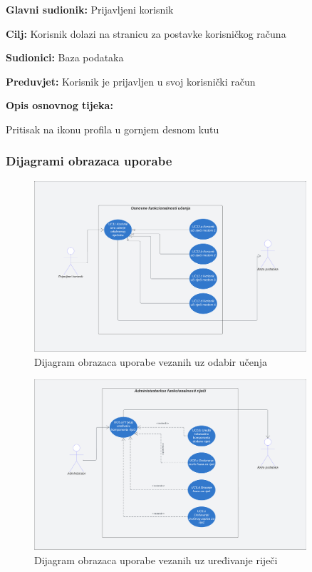 					\noindent {}
					\begin{packed_item}
						\item \textbf{Glavni sudionik:} Prijavljeni korisnik
						\item \textbf{Cilj:} Korisnik dolazi na stranicu za postavke korisničkog računa
						\item \textbf{Sudionici:} Baza podataka
						\item \textbf{Preduvjet:} Korisnik je prijavljen u svoj korisnički račun
						\item \textbf{Opis osnovnog tijeka:}
						\begin{packed_enum}
							\item Pritisak na ikonu profila u gornjem desnom kutu
						\end{packed_enum}
					\end{packed_item}


				\subsubsection{Dijagrami obrazaca uporabe}
				\begin{figure}[H]
					\includegraphics[width=0.9\textwidth]{dijagrami/OsnovnaFunkcionalnost.png} 
					\centering
					\caption{Dijagram obrazaca uporabe vezanih uz odabir učenja} 
					\label{fig:class_diagram}
				\end{figure}
					
				\begin{figure}[H]
					\includegraphics[width=0.9\textwidth]{dijagrami/OsnovnaFunkcionalnostAdmina.png} 
					\centering
					\caption{Dijagram obrazaca uporabe vezanih uz uređivanje riječi} 
					\label{fig:class_diagram}
				\end{figure}
					
